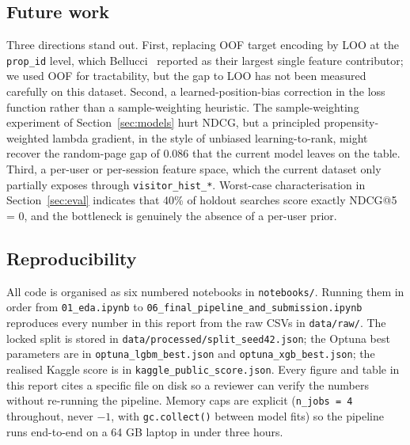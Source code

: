 \documentclass[runningheads]{llncs}
\begin{document}
\subsection{Future work}

Three directions stand out. First, replacing OOF target encoding by LOO at the \texttt{prop\_id} level, which Bellucci~\cite{bellucci2021dmt} reported as their largest single feature contributor; we used OOF for tractability, but the gap to LOO has not been measured carefully on this dataset. Second, a learned-position-bias correction in the loss function rather than a sample-weighting heuristic. The sample-weighting experiment of Section~\ref{sec:models} hurt NDCG, but a principled propensity-weighted lambda gradient, in the style of unbiased learning-to-rank, might recover the random-page gap of 0.086 that the current model leaves on the table. Third, a per-user or per-session feature space, which the current dataset only partially exposes through \texttt{visitor\_hist\_*}. Worst-case characterisation in Section~\ref{sec:eval} indicates that 40\% of holdout searches score exactly NDCG@5 = 0, and the bottleneck is genuinely the absence of a per-user prior.

\subsection{Reproducibility}

All code is organised as six numbered notebooks in \texttt{notebooks/}. Running them in order from \texttt{01\_eda.ipynb} to \texttt{06\_final\_pipeline\_and\_submission.ipynb} reproduces every number in this report from the raw CSVs in \texttt{data/raw/}. The locked split is stored in \texttt{data/processed/split\_seed42.json}; the Optuna best parameters are in \texttt{optuna\_lgbm\_best.json} and \texttt{optuna\_xgb\_best.json}; the realised Kaggle score is in \texttt{kaggle\_public\_score.json}. Every figure and table in this report cites a specific file on disk so a reviewer can verify the numbers without re-running the pipeline. Memory caps are explicit (\texttt{n\_jobs = 4} throughout, never $-1$, with \texttt{gc.collect()} between model fits) so the pipeline runs end-to-end on a 64 GB laptop in under three hours.



\end{document}
